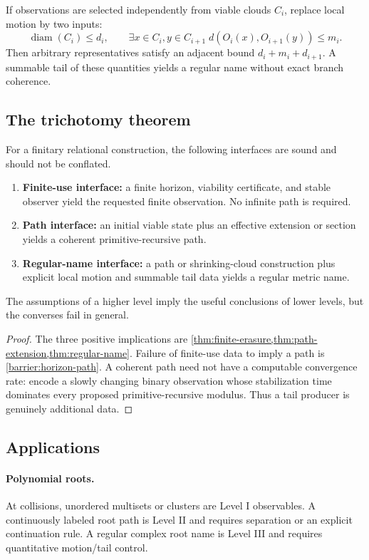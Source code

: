 If observations are selected independently from viable clouds \(C_i\), replace local motion by two inputs:
\[
 \operatorname{diam}(C_i)\le d_i,
 \qquad
 \exists x\in C_i,y\in C_{i+1}\; d(O_i(x),O_{i+1}(y))\le m_i.
\]
Then arbitrary representatives satisfy an adjacent bound \(d_i+m_i+d_{i+1}\).  A summable tail of these quantities yields a regular name without exact branch coherence.

\subsection{The trichotomy theorem}

\begin{theorem}\label{thm:coherence-trichotomy}
For a finitary relational construction, the following interfaces are sound and should not be conflated.
\begin{enumerate}
  \item \textbf{Finite-use interface:} a finite horizon, viability certificate, and stable observer yield the requested finite observation.  No infinite path is required.
  \item \textbf{Path interface:} an initial viable state plus an effective extension or section yields a coherent primitive-recursive path.
  \item \textbf{Regular-name interface:} a path or shrinking-cloud construction plus explicit local motion and summable tail data yields a regular metric name.
\end{enumerate}
The assumptions of a higher level imply the useful conclusions of lower levels, but the converses fail in general.
\end{theorem}

\begin{proof}
The three positive implications are \cref{thm:finite-erasure,thm:path-extension,thm:regular-name}.  Failure of finite-use data to imply a path is \cref{barrier:horizon-path}.  A coherent path need not have a computable convergence rate: encode a slowly changing binary observation whose stabilization time dominates every proposed primitive-recursive modulus.  Thus a tail producer is genuinely additional data.
\end{proof}

\subsection{Applications}

\paragraph{Polynomial roots.}
At collisions, unordered multisets or clusters are Level I observables.  A continuously labeled root path is Level II and requires separation or an explicit continuation rule.  A regular complex root name is Level III and requires quantitative motion/tail control.

